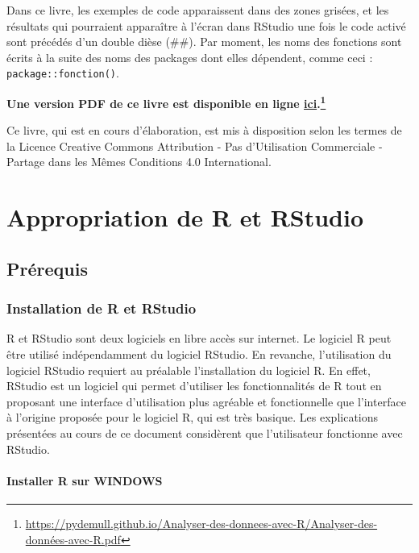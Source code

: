 \documentclass[
  french,
]{book}
\begin{document}
Dans ce livre, les exemples de code apparaissent dans des zones grisées, et les résultats qui pourraient apparaître à l'écran dans RStudio une fois le code activé sont précédés d'un double dièse (\#\#). Par moment, les noms des fonctions sont écrits à la suite des noms des packages dont elles dépendent, comme ceci : \texttt{package::fonction()}.

\textbf{Une version PDF de ce livre est disponible en ligne \href{https://pydemull.github.io/Analyser-des-donnees-avec-R/Analyser-des-données-avec-R.pdf}{ici}.\footnote{\url{https://pydemull.github.io/Analyser-des-donnees-avec-R/Analyser-des-données-avec-R.pdf}}}

Ce livre, qui est en cours d'élaboration, est mis à disposition selon les termes de la Licence Creative Commons Attribution - Pas d'Utilisation Commerciale - Partage dans les Mêmes Conditions 4.0 International.

\hypertarget{part-appropriation-de-r-et-rstudio}{%
\part{Appropriation de R et RStudio}\label{part-appropriation-de-r-et-rstudio}}

\hypertarget{pruxe9requis}{%
\chapter{Prérequis}\label{pruxe9requis}}

\hypertarget{installation-de-r-et-rstudio}{%
\section{Installation de R et RStudio}\label{installation-de-r-et-rstudio}}

R et RStudio sont deux logiciels en libre accès sur internet. Le logiciel R peut être utilisé indépendamment du logiciel RStudio. En revanche, l'utilisation du logiciel RStudio requiert au préalable l'installation du logiciel R. En effet, RStudio est un logiciel qui permet d'utiliser les fonctionnalités de R tout en proposant une interface d'utilisation plus agréable et fonctionnelle que l'interface à l'origine proposée pour le logiciel R, qui est très basique. Les explications présentées au cours de ce document considèrent que l'utilisateur fonctionne avec RStudio.

\hypertarget{installer-r-sur-windows}{%
\subsection{Installer R sur WINDOWS}\label{installer-r-sur-windows}}
\end{document}
